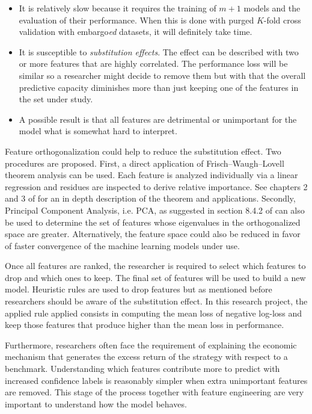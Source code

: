 \begin{itemize}
  \item It is relatively slow because it requires the training of $m + 1$ models and
        the evaluation of their performance. When this is done with purged $K$-fold cross
        validation with embargo\emph{ed} datasets, it will definitely take time.
  \item It is susceptible to \emph{substitution effects}. The effect can be described with two
        or more features that are highly correlated. The performance loss will be similar so
        a researcher might decide to remove them but with that the overall predictive 
        capacity diminishes more than just keeping one of the features in the set
        under study.
  \item A possible result is that all features are detrimental or unimportant
        for the model what is somewhat hard to interpret.
\end{itemize}

Feature orthogonalization could help to reduce the substitution effect. Two
procedures are proposed. First, a direct application of Frisch–Waugh–Lovell theorem
analysis can be used. Each feature is analyzed individually via a linear
regression and residues are inspected to derive relative importance. See
chapters 2 and 3 of \cite{econometric_theory_and_methods} for an in depth description
of the theorem and applications. Secondly, Principal Component Analysis, i.e. PCA,
as suggested in section 8.4.2 of \cite{lopez_de_prado} can also be used to
determine the set of features whose eigenvalues in the orthogonalized space are
greater. Alternatively, the feature space could also be reduced in favor of
faster convergence of the machine learning models under use.

Once all features are ranked, the researcher is required to select which
features to drop and which ones to keep. The final set of features will be used
to build a new model. Heuristic rules are used to drop features but as mentioned
before researchers should be aware of the substitution effect. In this research
project, the applied rule applied consists in computing the mean loss of
negative log-loss and keep those features that produce higher than the mean loss
in performance.

Furthermore, researchers often face the requirement of explaining the economic
mechanism that generates the excess return of the strategy with respect to a
benchmark. Understanding which features contribute more to predict with increased
confidence labels is reasonably simpler when extra unimportant features are
removed. This stage of the process together with feature engineering are very
important to understand how the model behaves.